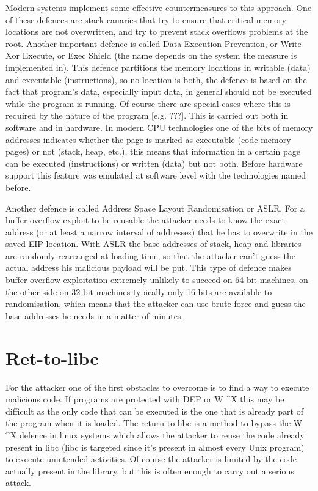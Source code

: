 \documentclass[Lau,binding=0.6cm]{sapthesis}
\begin{document}
Modern systems implement some effective countermeasures to this approach.
One of these defences are stack canaries that try to ensure that critical memory locations are not overwritten, and try to prevent stack overflows problems at the root.
Another important defence is called Data Execution Prevention, or Write Xor Execute, or Exec Shield (the name depends on the system the measure is implemented in). This defence partitions the memory locations in writable (data) and executable (instructions), so no location is both, the defence is based on the fact that program’s data, especially input data, in general should not be executed while the program is running. Of course there are special cases where this is required by the nature of the program [e.g. ???]. This is carried out both in software and in hardware. In modern CPU technologies one of the bits of memory addresses indicates whether the page is marked as executable (code memory pages) or not (stack, heap, etc.), this means that information in a certain page can be executed (instructions) or written (data) but not both. Before hardware support this feature was emulated at software level with the technologies named before.


Another defence is called Address Space Layout Randomisation or ASLR. For a buffer overflow exploit to be reusable the attacker needs to know the exact address (or at least a narrow interval of addresses) that he has to overwrite in the saved EIP location. With ASLR the base addresses of stack, heap and libraries are randomly rearranged at loading time, so that the attacker can’t guess the actual address his malicious payload will be put. This type of defence makes buffer overflow exploitation extremely unlikely to succeed on 64-bit machines, on the other side on 32-bit machines typically only 16 bits are available to randomisation, which means that the attacker can use brute force and guess the base addresses he needs in a 
matter of minutes.


\section{Ret-to-libc}

For the attacker one of the first obstacles to overcome is to find a way to execute malicious code. If programs are protected with DEP or W \textasciicircum X this may be difficult as the only code that can be executed is the one that is already part of the program when it is loaded.
The return-to-libc is a method to bypass the W \textasciicircum X defence in linux systems which allows the attacker to reuse the code already present in libc (libc is targeted since it’s present in almost every Unix program) to execute unintended activities. Of course the attacker is limited by the code actually present in the library, but this is often enough to carry out a serious attack.
\end{document}
